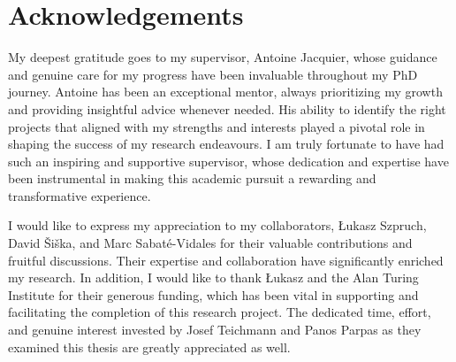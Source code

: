 \chapter*{Acknowledgements}



My deepest gratitude goes to my supervisor, Antoine Jacquier, whose guidance and genuine care for my progress have been invaluable throughout my PhD journey. Antoine has been an exceptional mentor, always prioritizing my growth and providing insightful advice whenever needed. His ability to identify the right projects that aligned with my strengths and interests played a pivotal role in shaping the success of my research endeavours. I am truly fortunate to have had such an inspiring and supportive supervisor, whose dedication and expertise have been instrumental in making this academic pursuit a rewarding and transformative experience.

I would like to express my appreciation to my collaborators, Łukasz Szpruch, David Šiška, and Marc Sabaté-Vidales for their valuable contributions and fruitful discussions. Their expertise and collaboration have significantly enriched my research. In addition, I would like to thank Łukasz and the Alan Turing Institute for their generous funding, which has been vital in supporting and facilitating the completion of this research project. The dedicated time, effort, and genuine interest invested by Josef Teichmann and Panos Parpas as they examined this thesis are greatly appreciated as well. %

